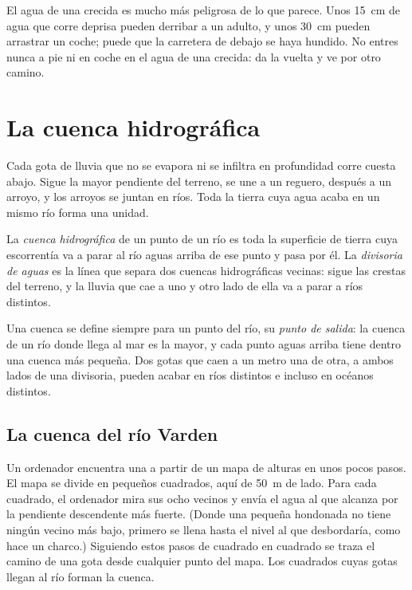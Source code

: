 \begin{safety}
El agua de una crecida es mucho más peligrosa de lo que parece. Unos
\qty{15}{cm} de agua que corre deprisa pueden derribar a un adulto, y unos
\qty{30}{cm} pueden arrastrar un coche; puede que la carretera de debajo se
haya hundido. No entres nunca a pie ni en coche en el agua de una crecida:
da la vuelta y ve por otro camino.
\end{safety}

\section{La cuenca hidrográfica}

Cada gota de lluvia que no se evapora ni se infiltra en profundidad corre
cuesta abajo. Sigue la mayor pendiente del terreno, se une a un reguero,
después a un arroyo, y los arroyos se juntan en ríos. Toda la tierra cuya
agua acaba en un mismo río forma una unidad.

\begin{definition}\label{def:g10:drainage-basins:drainage-basin}
La \emph{cuenca hidrográfica}
de un punto de un río es toda la superficie de tierra cuya escorrentía va a
parar al río aguas arriba de ese punto y pasa por él. La
\emph{divisoria de aguas} es la línea que separa dos cuencas hidrográficas vecinas:
sigue las crestas del terreno, y la lluvia que cae a uno y otro lado de ella
va a parar a ríos distintos.
\end{definition}

Una cuenca se define siempre para un punto del río, su \emph{punto de
salida}: la cuenca de un río donde llega al mar es la mayor, y cada punto
aguas arriba tiene dentro una cuenca más pequeña. Dos gotas que caen a un
metro una de otra, a ambos lados de una divisoria, pueden acabar en ríos
distintos e incluso en océanos distintos.

\subsection*{La cuenca del río Varden}

Un ordenador encuentra una  a partir de un mapa de alturas
en unos pocos pasos. El mapa se divide en pequeños cuadrados, aquí de
\qty{50}{m} de lado. Para cada cuadrado, el ordenador mira sus ocho vecinos y
envía el agua al que alcanza por la pendiente descendente más fuerte. (Donde
una pequeña hondonada no tiene ningún vecino más bajo, primero se llena hasta
el nivel al que desbordaría, como hace un charco.) Siguiendo estos pasos de
cuadrado en cuadrado se traza el camino de una gota desde cualquier punto del
mapa. Los cuadrados cuyas gotas llegan al río forman la cuenca.

